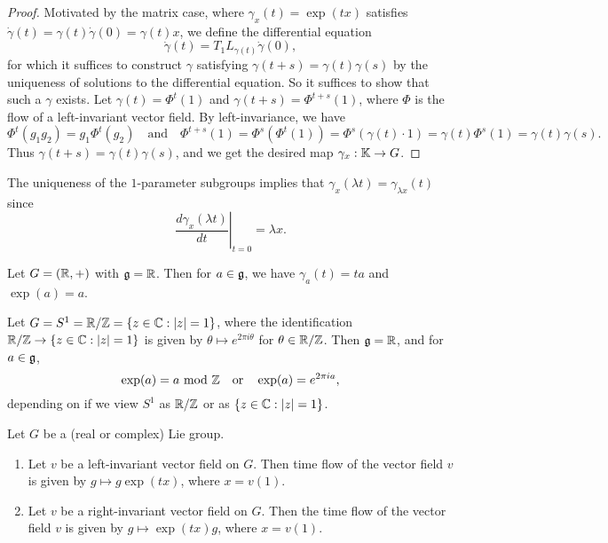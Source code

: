 \begin{proof}
  Motivated by the matrix case,
  where $\gamma_x(t) = \exp(tx)$
  satisfies $\dot{\gamma}(t) = \gamma(t) \dot{\gamma}(0) = \gamma(t) x$, we
  define the differential equation
  \[
    \dot{\gamma}(t)
    = T_1 L_{\gamma(t)} \dot{\gamma}(0),
  \]
  for which it suffices to construct
  $\gamma$ satisfying
  $\gamma(t + s) = \gamma(t) \gamma(s)$
  by the uniqueness of solutions to
  the differential equation. So it
  suffices to show that such a $\gamma$
  exists. Let
  $\gamma(t) = \Phi^t(1)$ and
  $\gamma(t + s) = \Phi^{t + s}(1)$,
  where $\Phi$ is the flow of
  a left-invariant vector field.
  By left-invariance, we have
  \[
    \Phi^t(g_1 g_2) = g_1 \Phi^t(g_2)
    \quad \text{and} \quad
    \Phi^{t + s}(1)
    = \Phi^s(\Phi^t(1))
    = \Phi^s(\gamma(t) \cdot 1)
    = \gamma(t) \Phi^s(1)
    = \gamma(t) \gamma(s).
  \]
  Thus $\gamma(t + s) = \gamma(t) \gamma(s)$, and
  we get the desired map
  $\gamma_x : \mathbb{K} \to G$.
\end{proof}

\begin{remark}
  The uniqueness of the
  $1$-parameter subgroups implies that
    $\gamma_x(\lambda t)
    = \gamma_{\lambda x}(t)$
  since
  \[
    \left.\frac{d \gamma_x(\lambda t)}{dt}\right|_{t = 0}
      = \lambda x.
  \]
\end{remark}

\begin{example}
  Let $G = (\mathbb{R}, +)$ with
  $\mathfrak{g} = \mathbb{R}$. Then for $a \in \mathfrak{g}$,
  we have $\gamma_a(t) = ta$
  and $\exp(a) = a$.
\end{example}

\begin{example}
  Let $G = S^1 = \mathbb{R} / \mathbb{Z} = \{z \in \mathbb{C} : |z| = 1\}$, where
  the identification
  $\mathbb{R} / \mathbb{Z} \to \{z \in \mathbb{C} : |z| = 1\}$
  is given by
  $\theta \mapsto e^{2 \pi i \theta}$
  for $\theta \in \mathbb{R} / \mathbb{Z}$.
  Then $\mathfrak{g} = \mathbb{R}$, and for $a \in \mathfrak{g}$,
  \[
    \exp(a) = a \ {\mathrm{mod}\ \mathbb{Z}}
    \quad \text{or} \quad
    \exp(a) = e^{2\pi i a},
  \]
  depending on if we view $S^1$
  as $\mathbb{R} / \mathbb{Z}$ or
  as $\{z \in \mathbb{C} : |z| = 1\}$.
\end{example}

\begin{prop}
  Let $G$ be a (real or complex) Lie
  group.
  \begin{enumerate}
    \item Let $v$ be a left-invariant
      vector field on $G$. Then
      time flow of the vector
      field $v$ is given by
      $g \mapsto g \exp(tx)$, where
      $x = v(1)$.
    \item Let $v$ be a right-invariant
      vector field on $G$. Then the time
      flow of the vector field $v$ is given by
      $g \mapsto \exp(tx) g$, where
      $x = v(1)$.
  \end{enumerate}
\end{prop}

